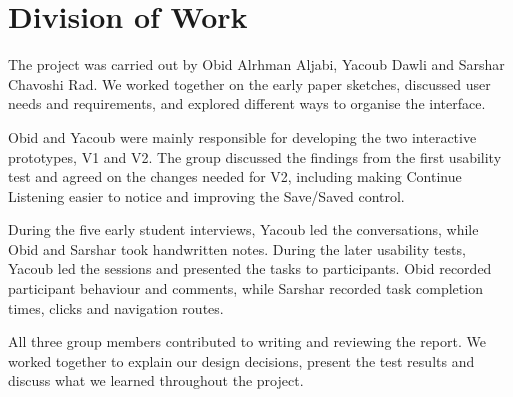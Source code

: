 \section{Division of Work}
\label{sec:division-of-work}

The project was carried out by Obid Alrhman Aljabi, Yacoub Dawli and Sarshar Chavoshi Rad. We worked together on the early paper sketches, discussed user needs and requirements, and explored different ways to organise the interface.

Obid and Yacoub were mainly responsible for developing the two interactive prototypes, V1 and V2. The group discussed the findings from the first usability test and agreed on the changes needed for V2, including making Continue Listening easier to notice and improving the Save/Saved control.

During the five early student interviews, Yacoub led the conversations, while Obid and Sarshar took handwritten notes. During the later usability tests, Yacoub led the sessions and presented the tasks to participants. Obid recorded participant behaviour and comments, while Sarshar recorded task completion times, clicks and navigation routes.

All three group members contributed to writing and reviewing the report. We worked together to explain our design decisions, present the test results and discuss what we learned throughout the project.
